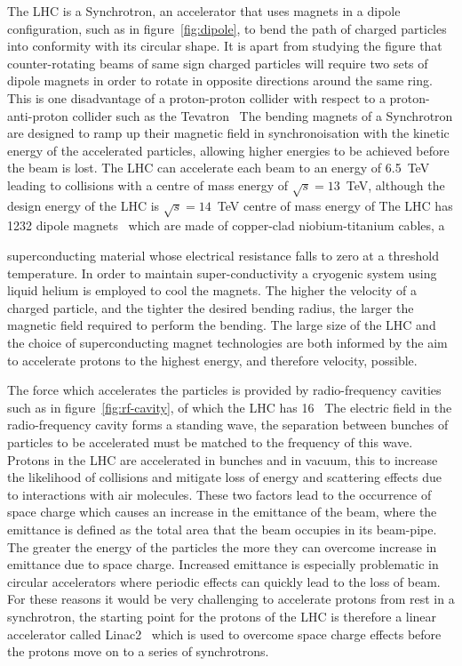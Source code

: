 The LHC is a Synchrotron, an accelerator that uses magnets in a dipole
configuration, such as in figure~\ref{fig:dipole}, to bend the path of charged
particles into conformity with its circular shape. It is apart from studying the
figure that counter-rotating beams of same sign charged particles will require
two sets of dipole magnets in order to rotate in opposite directions around the
same ring. This is one disadvantage of a proton-proton collider with respect to
a proton-anti-proton collider such as the Tevatron~\cite{tevatron} The bending magnets of a
Synchrotron are designed to ramp up their magnetic field in synchronoisation
with the kinetic energy of the accelerated particles, allowing higher energies
to be achieved before the beam is lost. The LHC can accelerate each beam to an
energy of 6.5~TeV leading to collisions with a centre of mass energy of
$\sqrt{s} = 13 $~TeV, although the design energy of the LHC is $\sqrt{s} = 14
$~TeV centre of mass energy of  The LHC has 1232 dipole magnets~\cite{LHC-dr}
which are made of copper-clad niobium-titanium cables, a

superconducting material whose electrical resistance falls to zero at a
threshold temperature. In order to maintain super-conductivity a cryogenic
system using liquid helium is employed to cool the magnets. The higher the
velocity of a charged particle, and the tighter the desired bending radius, the
larger the magnetic field required to perform the bending. The large size of the
LHC and the choice of superconducting magnet technologies are both informed by
the aim to accelerate protons to the highest energy, and therefore velocity,
possible.


The force which accelerates the particles is provided by radio-frequency
cavities such as in figure~\ref{fig:rf-cavity}, of which the LHC has
16~\cite{LHC-dr} The electric field in the radio-frequency cavity forms a
standing wave, the separation between bunches of particles to be accelerated
must be matched to the frequency of this wave. Protons in the LHC are
accelerated in bunches and in vacuum, this to increase the likelihood of
collisions and mitigate loss of energy and scattering effects due to
interactions with air molecules. These two factors lead to the occurrence of
space charge which causes an increase in the emittance of the beam, where the
emittance is defined as the total area that the beam occupies in its beam-pipe.
The greater the energy of the particles the more they can overcome increase in
emittance due to space charge. Increased emittance is especially problematic in
circular accelerators where periodic effects can quickly lead to the loss of
beam. For these reasons it would be very challenging to accelerate protons from
rest in a synchrotron, the starting point for the protons of the LHC is
therefore a linear accelerator called Linac2~\cite{linac2} which is used to
overcome space charge effects before the protons move on to a series of
synchrotrons.



